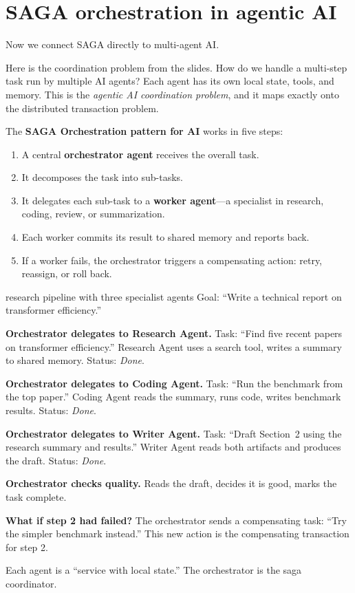 \documentclass[a4paper,11pt]{article}
\newcommand{\vocab}[1]{\textbf{\color{navy}#1}}
\begin{document}
\section{SAGA orchestration in agentic AI}

Now we connect SAGA directly to multi-agent AI.

Here is the coordination problem from the slides.
How do we handle a multi-step task run by multiple AI agents?
Each agent has its own local state, tools, and memory.
This is the \emph{agentic AI coordination problem}, and it maps exactly onto the distributed transaction problem.

The \vocab{SAGA Orchestration pattern for AI} works in five steps:
\begin{enumerate}
  \item A central \vocab{orchestrator agent} receives the overall task.
  \item It decomposes the task into sub-tasks.
  \item It delegates each sub-task to a \vocab{worker agent}---a specialist in research, coding, review, or summarization.
  \item Each worker commits its result to shared memory and reports back.
  \item If a worker fails, the orchestrator triggers a compensating action: retry, reassign, or roll back.
\end{enumerate}

\begin{worked}{research pipeline with three specialist agents}
Goal: ``Write a technical report on transformer efficiency.''

\begin{steps}
  \item \textbf{Orchestrator delegates to Research Agent.}
        Task: ``Find five recent papers on transformer efficiency.''
        Research Agent uses a search tool, writes a summary to shared memory.
        Status: \textit{Done}.
  \item \textbf{Orchestrator delegates to Coding Agent.}
        Task: ``Run the benchmark from the top paper.''
        Coding Agent reads the summary, runs code, writes benchmark results.
        Status: \textit{Done}.
  \item \textbf{Orchestrator delegates to Writer Agent.}
        Task: ``Draft Section~2 using the research summary and results.''
        Writer Agent reads both artifacts and produces the draft.
        Status: \textit{Done}.
  \item \textbf{Orchestrator checks quality.}
        Reads the draft, decides it is good, marks the task complete.
  \item \textbf{What if step 2 had failed?}
        The orchestrator sends a compensating task: ``Try the simpler benchmark instead.''
        This new action is the compensating transaction for step 2.
\end{steps}
Each agent is a ``service with local state.'' The orchestrator is the saga coordinator.
\end{worked}
\end{document}
